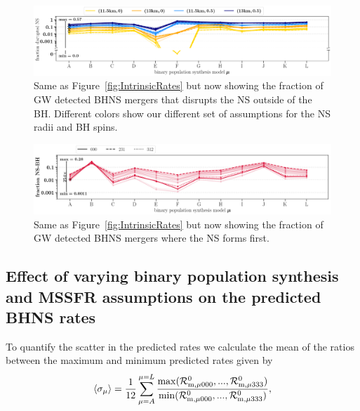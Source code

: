 \documentclass[twocolumn]{aastex63}
\newcommand\rate{\mathcal{R}}
\newcommand\bhnsSingle{BHNS\xspace}
\begin{document}
%
\begin{figure}
    \centering
\includegraphics[width=1.0\textwidth]{../PlottingScripts/8_PredictedRates_BPS_and_MSSFR_variations/EMRatios_observedlog.png} 
    \caption{Same as Figure~\ref{fig:IntrinsicRates} but now showing the fraction of \ac{GW} detected \bhnsSingle mergers that disrupts the \ac{NS} outside of the \ac{BH}. Different colors show our different set of assumptions for the \ac{NS} radii and \ac{BH} spins.  }
    \label{fig:ObservedRatesNSdisrupted}
\end{figure}
%

%
\begin{figure}
    \centering
\includegraphics[width=1.0\textwidth]{../PlottingScripts/8_PredictedRates_BPS_and_MSSFR_variations/NSBHRatios_observedpercentage.png} 
    \caption{Same as Figure~\ref{fig:IntrinsicRates} but now showing the fraction of \ac{GW} detected \bhnsSingle mergers where the \ac{NS} forms first. } 
    \label{fig:ObservedRatesNSBH}
\end{figure}
%



\subsection{Effect of varying binary population synthesis and \ac{MSSFR} assumptions  on the predicted  \bhnsSingle rates}
%
To quantify the scatter in the predicted rates  we calculate  the mean of the ratios between the maximum and minimum predicted rates given by
%
\begin{equation}
\langle \sigma_{\rm{\mu}} \rangle = \frac{1}{12} \sum_{\mu=A}^{\mu=L}
 \frac{\rm{max}(\rate_{\rm{m, \mu000}}^0,... ,\rate_{\rm{m, \mu333}}^0 )}{\rm{min}(\rate_{\rm{m, \mu000}}^0,... ,\rate_{\rm{m, \mu333}}^0 ) }, 
\end{equation} 
%
\end{document}
